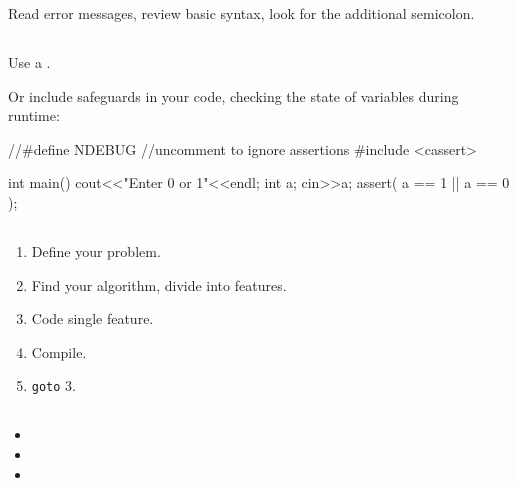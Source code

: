 \documentclass[10pt,a4paper]{scrartcl}
\begin{document}
\begin{multicols*}{2}
Read error messages, review basic syntax, look for the additional semicolon.

\subsection{}
\label{CorrectRuntimeErrors}

Use a .

Or include safeguards in your code, checking the state of variables during runtime:

\begin{TPCpp}
//#define NDEBUG  //uncomment to ignore assertions
#include <cassert>

int main(){
	cout<<"Enter 0 or 1"<<endl;
	int a;
	cin>>a;
	assert( a == 1 || a == 0 );
}
\end{TPCpp}

\subsection{}
\label{sec:ApproachProblems}

\begin{enumerate}
\item Define your problem.
\item Find your algorithm, divide into features.
\item Code single feature.
\item Compile.
\item \verb+goto+ 3.
\end{enumerate}

\subsection{}
\label{sec:FindMoreInformation}

\begin{itemize}
\item {}
\item {}
\item {}
\end{itemize}
\fi

\glsaddall


\end{multicols*}
\end{document}
